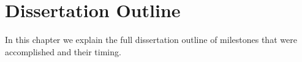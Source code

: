 \chapter{Dissertation Outline}
\label{chap:outline}

In this chapter we explain the full dissertation outline of milestones that were accomplished and their timing.

% 
% 
% 
% 

